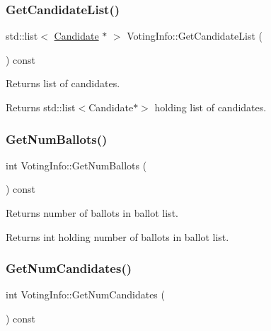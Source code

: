 \subsubsection{\texorpdfstring{Get\+Candidate\+List()}{GetCandidateList()}}
{\footnotesize\ttfamily std\+::list$<$ \hyperlink{classCandidate}{Candidate} $\ast$ $>$ Voting\+Info\+::\+Get\+Candidate\+List (\begin{DoxyParamCaption}{ }\end{DoxyParamCaption}) const}



Returns list of candidates. 

\begin{DoxyReturn}{Returns}
std\+::list$<$\+Candidate$\ast$$>$ holding list of candidates. 
\end{DoxyReturn}
\mbox{\label{classVotingInfo_af84ccfdfbdf95bc33f959d8b82e27d8c}} 
\subsubsection{\texorpdfstring{Get\+Num\+Ballots()}{GetNumBallots()}}
{\footnotesize\ttfamily int Voting\+Info\+::\+Get\+Num\+Ballots (\begin{DoxyParamCaption}{ }\end{DoxyParamCaption}) const}



Returns number of ballots in ballot list. 

\begin{DoxyReturn}{Returns}
int holding number of ballots in ballot list. 
\end{DoxyReturn}
\mbox{\label{classVotingInfo_add7749e53650135da703aa7b816598f5}} 
\subsubsection{\texorpdfstring{Get\+Num\+Candidates()}{GetNumCandidates()}}
{\footnotesize\ttfamily int Voting\+Info\+::\+Get\+Num\+Candidates (\begin{DoxyParamCaption}{ }\end{DoxyParamCaption}) const}




